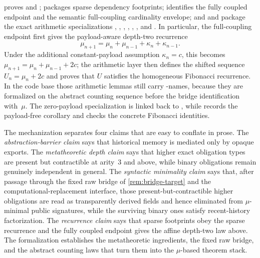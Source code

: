 \documentclass{lmcs}
\begin{document}
 proves  and ;  packages sparse dependency footprints;  identifies the fully coupled endpoint and the semantic full-coupling cardinality envelope; and  and  package the exact arithmetic specializations , , , , , , and . In particular, the full-coupling endpoint first gives the payload-aware depth-two recurrence
\[
  \mu_{n+1} = \mu_n + \mu_{n-1} + \kappa_n+\kappa_{n-1}.
\]
Under the additional constant-payload assumption $\kappa_n=c$, this becomes
$\mu_{n+1}=\mu_n+\mu_{n-1}+2c$; the arithmetic layer then defines the shifted
sequence $U_n=\mu_n+2c$ and proves that $U$ satisfies the homogeneous Fibonacci
recurrence. In the code base those arithmetic lemmas still carry
-names, because they are formalized on the abstract counting
sequence before the bridge identification with~$\mu$. The zero-payload
specialization is linked back to , while
 records the payload-free corollary
and  checks the concrete Fibonacci identities.

The mechanization separates four claims that are easy to conflate in prose. The \emph{abstraction-barrier claim} says that historical memory is mediated only by opaque exports. The \emph{metatheoretic depth claim} says that higher exact obligation types are present but contractible at arity~$3$ and above, while binary obligations remain genuinely independent in general. The \emph{syntactic minimality claim} says that, after passage through the fixed raw bridge of \autoref{rem:bridge-target} and the computational-replacement interface, those present-but-contractible higher obligations are read as transparently derived fields and hence eliminated from $\mu$-minimal public signatures, while the surviving binary ones satisfy recent-history factorization. The \emph{recurrence claim} says that sparse footprints obey the sparse recurrence and the fully coupled endpoint gives the affine depth-two law above. The formalization establishes the metatheoretic ingredients, the fixed raw bridge, and the abstract counting laws that turn them into the $\mu$-based theorem stack.
\end{document}
